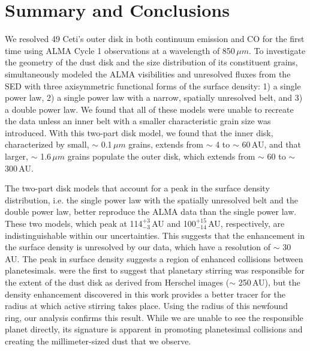 \chapter{Summary and Conclusions}

We resolved 49 Ceti's outer disk in both continuum emission and CO for the first time using ALMA Cycle 1 observations at a wavelength of 850\,$\mu m$. To investigate the geometry of the dust disk and the size distribution of its constituent grains,  simultaneously modeled the ALMA visibilities and unresolved fluxes from the SED with three axisymmetric functional forms of the surface density: 1) a single power law, 2) a single power law with a narrow, spatially unresolved belt, and 3) a double power law. We found that all of these models were unable to recreate the data unless an inner belt with a smaller characteristic grain size was introduced. With this two-part disk model, we found that the inner disk, characterized by small, $\sim$ 0.1\,$\mu m$ grains, extends from $\sim$ 4 to $\sim$ 60\,AU, and that larger, $\sim$ 1.6\,$\mu m$ grains populate the outer disk, which extends from $\sim$ 60 to $\sim$ 300\,AU. 

The two-part disk models that account for a peak in the surface density distribution, i.e. the single power law with the spatially unresolved belt and the double power law, better reproduce the ALMA data than the single power law. These two models, which peak at 114$^{+3}_{-3}$\,AU and 100$^{+15}_{-14}$\,AU, respectively, are indistinguishable within our uncertainties. This suggests that the enhancement in the surface density is unresolved by our data, which have a resolution of $\sim$ 30\,AU. The peak in surface density suggests a region of enhanced collisions between planetesimals. \cite{Moor15} were the first to suggest that planetary stirring was responsible for the extent of the dust disk as derived from Herschel images ($\sim$ 250\,AU), but the density enhancement discovered in this work provides a better tracer for the radius at which active stirring takes place. Using the radius of this newfound ring, our analysis confirms this result. While we are unable to see the responsible planet directly, its signature is apparent in promoting planetesimal collisions and creating the millimeter-sized dust that we observe. 


